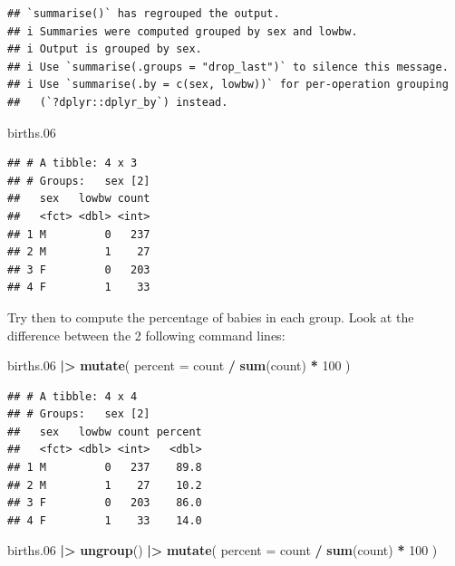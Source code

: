 \documentclass[
]{book}
\newenvironment{Shaded}{\begin{snugshade}}{\end{snugshade}}
\newcommand{\AttributeTok}[1]{\textcolor[rgb]{0.13,0.29,0.53}{#1}}
\newcommand{\DecValTok}[1]{\textcolor[rgb]{0.00,0.00,0.81}{#1}}
\newcommand{\FloatTok}[1]{\textcolor[rgb]{0.00,0.00,0.81}{#1}}
\newcommand{\FunctionTok}[1]{\textcolor[rgb]{0.13,0.29,0.53}{\textbf{#1}}}
\newcommand{\NormalTok}[1]{#1}
\newcommand{\SpecialCharTok}[1]{\textcolor[rgb]{0.81,0.36,0.00}{\textbf{#1}}}
\begin{document}
\begin{verbatim}
## `summarise()` has regrouped the output.
## i Summaries were computed grouped by sex and lowbw.
## i Output is grouped by sex.
## i Use `summarise(.groups = "drop_last")` to silence this message.
## i Use `summarise(.by = c(sex, lowbw))` for per-operation grouping
##   (`?dplyr::dplyr_by`) instead.
\end{verbatim}

\begin{Shaded}
\begin{Highlighting}[]
\NormalTok{births}\FloatTok{.06}
\end{Highlighting}
\end{Shaded}

\begin{verbatim}
## # A tibble: 4 x 3
## # Groups:   sex [2]
##   sex   lowbw count
##   <fct> <dbl> <int>
## 1 M         0   237
## 2 M         1    27
## 3 F         0   203
## 4 F         1    33
\end{verbatim}

Try then to compute the percentage of babies in each group.
Look at the difference between the 2 following command lines:

\begin{Shaded}
\begin{Highlighting}[]
\NormalTok{births}\FloatTok{.06} \SpecialCharTok{|\textgreater{}}
  \FunctionTok{mutate}\NormalTok{(}
    \AttributeTok{percent =}\NormalTok{ count }\SpecialCharTok{/} \FunctionTok{sum}\NormalTok{(count) }\SpecialCharTok{*} \DecValTok{100}
\NormalTok{  )}
\end{Highlighting}
\end{Shaded}

\begin{verbatim}
## # A tibble: 4 x 4
## # Groups:   sex [2]
##   sex   lowbw count percent
##   <fct> <dbl> <int>   <dbl>
## 1 M         0   237    89.8
## 2 M         1    27    10.2
## 3 F         0   203    86.0
## 4 F         1    33    14.0
\end{verbatim}

\begin{Shaded}
\begin{Highlighting}[]
\NormalTok{births}\FloatTok{.06} \SpecialCharTok{|\textgreater{}}
  \FunctionTok{ungroup}\NormalTok{() }\SpecialCharTok{|\textgreater{}}
  \FunctionTok{mutate}\NormalTok{(}
    \AttributeTok{percent =}\NormalTok{ count }\SpecialCharTok{/} \FunctionTok{sum}\NormalTok{(count) }\SpecialCharTok{*} \DecValTok{100}
\NormalTok{  )}
\end{Highlighting}
\end{Shaded}
\end{document}
